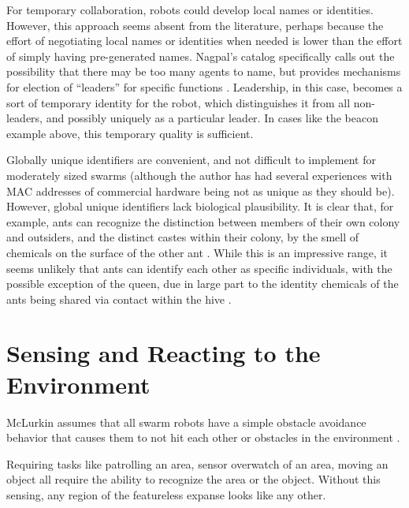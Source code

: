 \documentclass[]{article}
\begin{document}
For temporary collaboration, robots could develop local names or identities. 
However, this approach seems absent from the literature, perhaps because the effort of negotiating local names or identities when needed is lower than the effort of simply having pre-generated names. 
Nagpal's catalog specifically calls out the possibility that there may be too many agents to name, but provides mechanisms for election of ``leaders'' for specific functions \cite{nagpal2004catalog}. 
Leadership, in this case, becomes a sort of temporary identity for the robot, which distinguishes it from all non-leaders, and possibly uniquely as a particular leader. 
In cases like the beacon example above, this temporary quality is sufficient.  

Globally unique identifiers are convenient, and not difficult to implement for moderately sized swarms (although the author has had several experiences with MAC addresses of commercial hardware being not as unique as they should be).
However, global unique identifiers lack biological plausibility. 
It is clear that, for example, ants can recognize the distinction between members of their own colony and outsiders, and the distinct castes within their colony, by the smell of chemicals on the surface of the other ant \cite{sharma2015cuticular}. 
While this is an impressive range, it seems unlikely that ants can identify each other as specific individuals, with the possible exception of the queen, due in large part to the identity chemicals of the ants being shared via contact within the hive \cite{bos2012recognition}. 

\section {Sensing and Reacting to the Environment}

McLurkin assumes that all swarm robots have a simple obstacle avoidance behavior that causes them to not hit each other or obstacles in the environment \cite{mclurkin2004stupid}.

Requiring tasks like patrolling an area, sensor overwatch of an area, moving an object all require the ability to recognize the area or the object. Without this sensing, any region of the featureless expanse looks like any other. 



\end{document}
